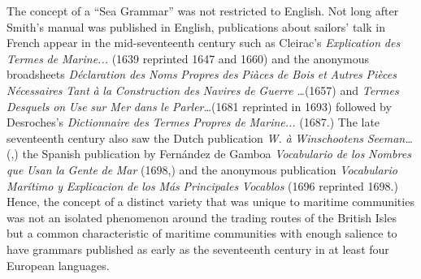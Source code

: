 The concept of a “Sea Grammar” was not restricted to English. Not long after Smith’s manual was published in English, publications about sailors’ talk in French appear in the mid-seventeenth century such as Cleirac’s \textit{Explication} \textit{des} \textit{Termes} \textit{de} \textit{Marine...} (1639 reprinted 1647 and 1660) and the anonymous broadsheets \textit{Déclaration} \textit{des} \textit{Noms} \textit{Propres} \textit{des} \textit{Piàces} \textit{de} \textit{Bois} \textit{et} \textit{Autres} \textit{Pièces} \textit{Nécessaires} \textit{Tant} \textit{à} \textit{la} \textit{Construction} \textit{des} \textit{Navires} \textit{de} \textit{Guerre} \textit{…}(1657) and \textit{Termes} \textit{Desquels} \textit{on} \textit{Use} \textit{sur} \textit{Mer} \textit{dans} \textit{le} \textit{Parler…}(1681 reprinted in 1693) followed by Desroches’s \textit{Dictionnaire} \textit{des} \textit{Termes} \textit{Propres} \textit{de} \textit{Marine...} (1687.) The late seventeenth century also saw the Dutch publication \textit{W.} \textit{à} \textit{Winschootens} \textit{Seeman…} (\citealt{Winschooten1681},) the Spanish publication by Fernández de Gamboa \textit{Vocabulario} \textit{de} \textit{los} \textit{Nombres} \textit{que} \textit{Usan} \textit{la} \textit{Gente} \textit{de} \textit{Mar} (1698,) and the anonymous publication \textit{Vocabulario} \textit{Marítimo} \textit{y} \textit{Explicacion} \textit{de} \textit{los} \textit{Más} \textit{Principales} \textit{Vocablos} (1696 reprinted 1698.) Hence, the concept of a distinct variety that was unique to maritime communities was not an isolated phenomenon around the trading routes of the British Isles but a common characteristic of maritime communities with enough salience to have grammars published as early as the seventeenth century in at least four European languages. 



